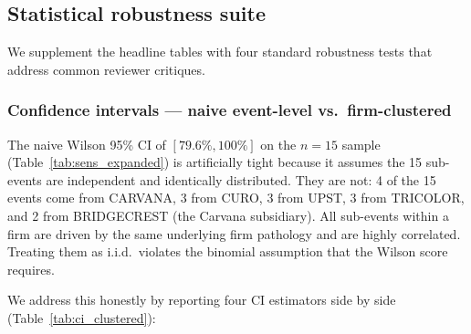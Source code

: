 \documentclass[11pt,a4paper]{article}
\begin{document}
\subsection{Statistical robustness suite}\label{sec:results_robustness}

We supplement the headline tables with four standard robustness tests that address common reviewer critiques.

\subsubsection{Confidence intervals — naive event-level vs.\ firm-clustered}

The naive Wilson 95\% CI of $[79.6\%, 100\%]$ on the $n=15$ sample (Table~\ref{tab:sens_expanded}) is artificially tight because it assumes the 15 sub-events are independent and identically distributed. They are not: 4 of the 15 events come from CARVANA, 3 from CURO, 3 from UPST, 3 from TRICOLOR, and 2 from BRIDGECREST (the Carvana subsidiary). All sub-events within a firm are driven by the same underlying firm pathology and are highly correlated. Treating them as i.i.d.\ violates the binomial assumption that the Wilson score requires.

We address this honestly by reporting four CI estimators side by side (Table~\ref{tab:ci_clustered}):
\end{document}
